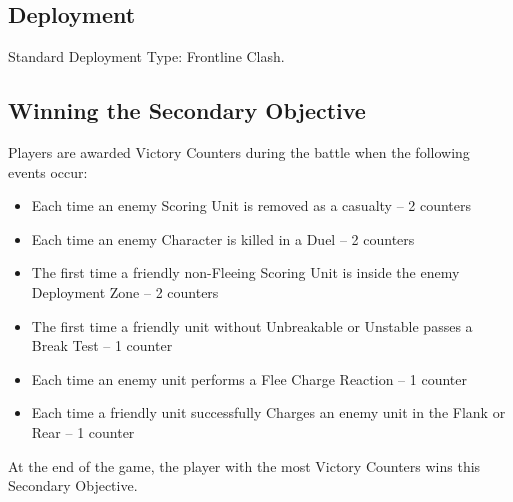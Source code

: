 
\label{EscapeFromBeyondTheVeil}


\subsection*{Deployment}

Standard Deployment Type: Frontline Clash.


\subsection*{Winning the Secondary Objective}

Players are awarded Victory Counters during the battle when the following events occur:

\begin{itemize}
\item Each time an enemy Scoring Unit is removed as a casualty -- 2 counters
\item Each time an enemy Character is killed in a Duel -- 2 counters 
\item The first time a friendly non-Fleeing Scoring Unit is inside the enemy Deployment Zone -- 2 counters
\item The first time a  friendly unit without Unbreakable or Unstable passes a Break Test -- 1 counter
\item Each time an enemy unit performs a Flee Charge Reaction -- 1 counter
\item Each time a friendly unit successfully Charges an enemy unit in the Flank or Rear -- 1 counter
\end{itemize}

At the end of the game, the player with the most Victory Counters wins this Secondary Objective.
